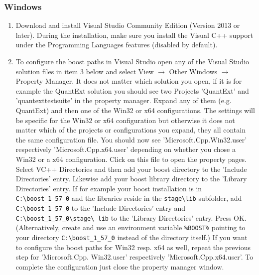 \documentclass[12pt, a4paper]{article}
\newcommand{\bs}{\textbackslash}
\begin{document}
\subsubsection*{Windows}

\begin{enumerate}

\item Download and install Visual Studio Community Edition (Version 2013 or later). 
During the installation, make sure you install the Visual
C++ support under the Programming Languages features (disabled by default).

\item To configure the boost paths in Visual Studio open any of the Visual Studio solution files in item 3 below and
  select View $\rightarrow$ Other Windows $\rightarrow$ Property Manager. It does not matter which solution you open, if
  it is for example the Quant\-Ext solution you should see two Projects 'QuantExt' and 'quantexttestsuite' in the property
  manager. Expand any of them (e.g. QuantExt) and then one of the Win32 or x64 configurations. The settings will be
  specific for the Win32 or x64 configuration but otherwise it does not matter which of the projects or configurations
  you expand, they all contain the same configuration file. You should now see 'Microsoft.Cpp.Win32.user' respectively
  'Microsoft.Cpp.x64.user' depending on whether you chose a Win32 or a x64 configuration. Click on this file to open the
  property pages. Select VC++ Directories and then add your boost directory to the 'Include Directories' entry. Likewise
  add your boost library directory to the 'Library Directories' entry. If for example your boost installation is in {\tt
    C:{\bs}boost\_1\_57\_0} and the libraries reside in the {\tt stage{\bs}lib} subfolder, add {\tt
    C:{\bs}boost\_1\_57\_0} to the 'Include Directories' entry and {\tt C:{\bs}boost\_1\_57\_0{\bs}stage{\bs} lib} to the
  'Library Directories' entry. Press OK. 
  (Alternatively, create and use an environment variable {\tt \%BOOST\%} pointing to your directory {\tt C:{\bs}boost\_1\_57\_0} instead of the directory itself.) 
  If you want to configure the boost paths for Win32 resp. x64 as well, repeat
  the previous step for 'Microsoft.Cpp. Win32.user' respectively 'Microsoft.Cpp.x64.user'. To complete the configuration
  just close the property manager window.


\end{enumerate}
\end{document}
